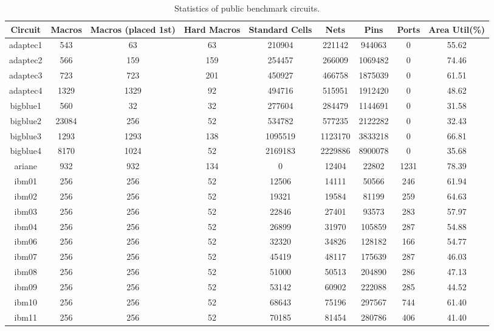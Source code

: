 \documentclass{article}
\theoremstyle{plain}
\theoremstyle{definition}
\theoremstyle{remark}
\begin{document}
\begin{table}[!ht]
 \small
	\caption{Statistics of public benchmark circuits.}
	\label{statistics}
	\centering
	\begin{tabular}{ccccccccc}
		\toprule
		Circuit & Macros & Macros (placed 1st)  & Hard Macros & Standard Cells & Nets & Pins & Ports & Area Util(\%)  \\
		\midrule
        adaptec1 & 543 & 63 & 63 & 210904 & 221142 & 944063 & 0 & 55.62  \\ 
        adaptec2 & 566 & 159 & 159 & 254457 & 266009 & 1069482 & 0 & 74.46  \\ 
        adaptec3 & 723 & 723 & 201 & 450927 & 466758 & 1875039 & 0 & 61.51  \\ 
        adaptec4 & 1329 & 1329 & 92 & 494716 & 515951 & 1912420 & 0 & 48.62  \\ 
        bigblue1 & 560 & 32 & 32 & 277604 & 284479 & 1144691 & 0 & 31.58  \\ 
        bigblue2 & 23084 & 256 & 52 & 534782 & 577235 & 2122282 & 0 & 32.43  \\ 
        bigblue3 & 1293 & 1293 & 138 & 1095519 & 1123170 & 3833218 & 0 & 66.81  \\ 
        bigblue4 & 8170 & 1024 & 52 & 2169183 & 2229886 & 8900078 & 0 & 35.68  \\ 
        ariane & 932 & 932 & 134 & 0 & 12404 & 22802 & 1231 & 78.39  \\ 
        ibm01 & 256 & 256 & 52 & 12506 & 14111 & 50566 & 246 & 61.94  \\ 
        ibm02 & 256 & 256 & 52 & 19321 & 19584 & 81199 & 259 & 64.63  \\ 
        ibm03 & 256 & 256 & 52 & 22846 & 27401 & 93573 & 283 & 57.97  \\ 
        ibm04 & 256 & 256 & 52 & 26899 & 31970 & 105859 & 287 & 54.88  \\ 
        ibm06 & 256 & 256 & 52 & 32320 & 34826 & 128182 & 166 & 54.77  \\ 
        ibm07 & 256 & 256 & 52 & 45419 & 48117 & 175639 & 287 & 46.03  \\ 
        ibm08 & 256 & 256 & 52 & 51000 & 50513 & 204890 & 286 & 47.13  \\ 
        ibm09 & 256 & 256 & 52 & 53142 & 60902 & 222088 & 285 & 44.52  \\
        ibm10 & 256 & 256 & 52 & 68643 & 75196 & 297567 & 744 & 61.40  \\ 
        ibm11 & 256 & 256 & 52 & 70185 & 81454 & 280786 & 406 & 41.40  \\ 

\end{tabular}
\end{table}
\end{document}
